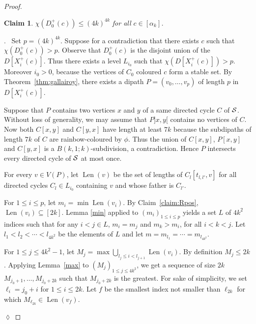 \documentclass[utf8,10pt]{article}
\theoremstyle{plain}
\newtheorem{claim}{Claim}[theorem]
\theoremstyle{definition}
\theoremstyle{remark}
\newenvironment{subproof}{\par\noindent {\it Subproof}.\ }{\hfill$\lozenge$\par\vspace{11pt}}
\DeclareMathOperator{\Len}{Len}
\begin{document}
\begin{proof}
\begin{claim}\label{claim:D0}
$\chi(D^+_0(c))\leq (4k)^{4k}$ for all $c\in [\alpha_k]$. 
\end{claim}
\begin{subproof}
Set $p=(4k)^{4k}$.
Suppose for a contradiction that there exists $c$ such that $\chi(D^+_0(c)) > p$. 
Observe that $D^+_0(c)$ is the disjoint union of the $D[X^+_i(c)]$. Thus there exists a level $L_{i_0}$ such that $\chi(D[X^+_i(c)]) >p$.
Moreover $i_0>0$, because the vertices of $C_0$ coloured $c$ form a stable set.
 By Theorem~\ref{thm:gallairoy}, there exists a dipath $P=(v_0,  \dots , v_{p})$ of length $p$ in $D[X^+_i(c)]$.



Suppose that $P$ contains two vertices $x$ and $y$ of a same directed cycle $C$ of ${\cal S}$. 
Without loss of generality, we may assume that $P]x,y[$ contains no vertices of $C$.
Now  both $C[x,y]$ and $C[y,x]$ have length at least $7k$ because the subdipaths of  length $7k$ of $C$ are rainbow-coloured by $\phi$. 
Thus the union of $C[x,y]$, $P[x,y]$ and $C[y,x]$ is a $B(k,1;k)$-subdivision, a contradiction.
Hence $P$ intersects every directed cycle of ${\cal S}$ at most once.



\medskip


For every $v\in V(P)$, let $\Len(v)$ be the set of lengths of $C_l[t_{l,l'},v]$ for all directed cycles $C_l \in  L_{i_0}$ containing $v$ and whose father is $C_{l'}$.


For $1\leq i\leq p$, let $m_i = \min \Len(v_i)$. By Claim~\ref{claim:Rpos}, $\Len(v_i) \subseteq [2k]$.
Lemma \ref{min} applied to $(m_i)_{1\leq i\leq p}$ yields a set $L$ of $4k^2$ indices such that 
for any $i< j \in L$,  $m_i=m_j$ and $m_k > m_i$, for all $i< k < j$.
Let $l_1 < l_2 < \cdots < l_{4k^2}$ be the elements of $L$ and let $m= m_{l_1} = \cdots = m_{l_{4k^2}}$.


For $1\leq j\leq 4k^2-1$, let $M_j = \max \bigcup_{l_j\leq i < l_{j+1}} \Len(v_i)$.
By definition $M_j\leq 2k$.
Applying Lemma~\ref{max} to $(M_j)_{1\leq j\leq 4k^2}$,  we get a sequence of size $2k$ $M_{j_0+1}, \dots, M_{j_0+{2k}}$ such that $M_{j_0+{2k}}$ is the greatest. 
For sake of simplicity, we set $\ell_i =j_0+i$ for $1\leq i\leq 2k$.
Let $f$ be  the smallest index not smaller than $\ell_{2k}$ for which $M_{\ell_{2k}} \in \Len (v_f)$. 


\end{subproof}
\end{proof}
\end{document}
